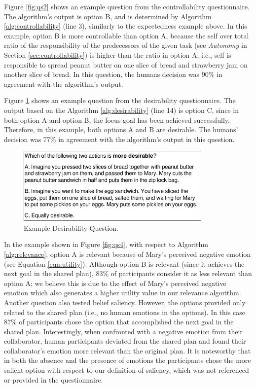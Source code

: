 \documentclass[12pt]{report}
\begin{document}
Figure \ref{fig:qs2} shows an example question from the controllability
questionnaire. The algorithm's output is option B, and is determined by
Algorithm \ref{alg:controllability} (line 3), similarly to the expectedness
example above. In this example, option B is more controllable than option A,
because the self over total ratio of the responsibility of the predecessors of
the given task (see \textit{Autonomy} in Section \ref{sec:controllability}) is
higher than the ratio in option A; i.e., self is responsible to spread peanut
butter on one slice of bread and strawberry jam on another slice of bread. In
this question, the humans decision was 90\% in agreement with the algorithm's
output.

Figure \ref{fig:qs3} shows an example question from the desirability
questionnaire. The output based on the Algorithm \ref{alg:desirability}
(line 14) is option C, since in both option A and option B, the focus goal
has been achieved successfully. Therefore, in this example, both options A and B
are desirable. The humans' decision was 77\% in agreement with the algorithm's
output in this question.

\begin{figure}[tbh]
  \vspace{-4mm}
  \centering
  \includegraphics[width=0.85\textwidth]{figure/question-sample3-croped.pdf}
  \caption{{\fontsize{9}{9}\selectfont Example Desirability Question.}}
  \label{fig:qs3}
  \vspace{-5mm}
\end{figure}

In the example shown in Figure \ref{fig:qs4}, with respect to Algorithm
\ref{alg:relevance}, option A is relevant because of Mary's perceived negative
emotion (see Equation \ref{eqn:utility}). Although option B is relevant (since
it achieves the next goal in the shared plan), 83\% of participants consider it as
less relevant than option A; we believe this is due to the effect of Mary's
perceived negative emotion which also generates a higher utility value in our
relevance algorithm. Another question also tested belief saliency. However, the
options provided only related to the shared plan (i.e., no human emotions in the
options). In this case 87\% of participants chose the option that accomplished the
next goal in the shared plan. Interestingly, when confronted with a negative
emotion from their collaborator, human participants deviated from the shared plan
and found their collaborator's emotion more relevant than the original plan. It
is noteworthy that in both the absence and the presence of emotions the
participants chose the more salient option with respect to our definition of
saliency, which was not referenced or provided in the questionnaire.
\end{document}
